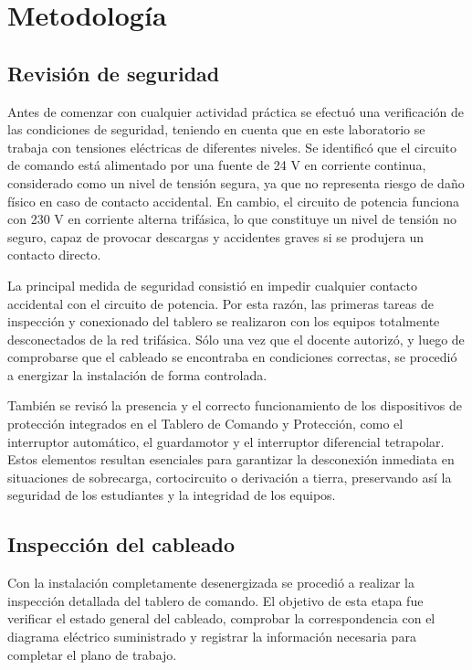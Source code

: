 \section{Metodología}
\subsection{Revisión de seguridad}

Antes de comenzar con cualquier actividad práctica se efectuó una verificación de las condiciones de seguridad, teniendo en cuenta que en este laboratorio se trabaja con tensiones eléctricas de diferentes niveles. Se identificó que el circuito de comando está alimentado por una fuente de 24 V en corriente continua, considerado como un nivel de tensión segura, ya que no representa riesgo de daño físico en caso de contacto accidental. En cambio, el circuito de potencia funciona con 230 V en corriente alterna trifásica, lo que constituye un nivel de tensión no seguro, capaz de provocar descargas y accidentes graves si se produjera un contacto directo.  

La principal medida de seguridad consistió en impedir cualquier contacto accidental con el circuito de potencia. Por esta razón, las primeras tareas de inspección y conexionado del tablero se realizaron con los equipos totalmente desconectados de la red trifásica. Sólo una vez que el docente autorizó, y luego de comprobarse que el cableado se encontraba en condiciones correctas, se procedió a energizar la instalación de forma controlada.  

También se revisó la presencia y el correcto funcionamiento de los dispositivos de protección integrados en el Tablero de Comando y Protección, como el interruptor automático, el guardamotor y el interruptor diferencial tetrapolar. Estos elementos resultan esenciales para garantizar la desconexión inmediata en situaciones de sobrecarga, cortocircuito o derivación a tierra, preservando así la seguridad de los estudiantes y la integridad de los equipos.

\subsection{Inspección del cableado}

Con la instalación completamente desenergizada se procedió a realizar la inspección detallada del tablero de comando. El objetivo de esta etapa fue verificar el estado general del cableado, comprobar la correspondencia con el diagrama eléctrico suministrado y registrar la información necesaria para completar el plano de trabajo.  

